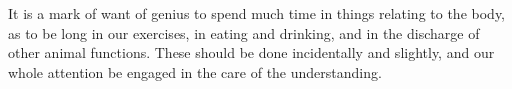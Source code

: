 It is  a mark of want  of genius to spend  much time in things  relating to the
body,  as to  be long  in our  exercises, in  eating and  drinking, and  in the
discharge  of other  animal functions.  These should  be done  incidentally and
slightly, and our whole attention be engaged in the care of the understanding.

